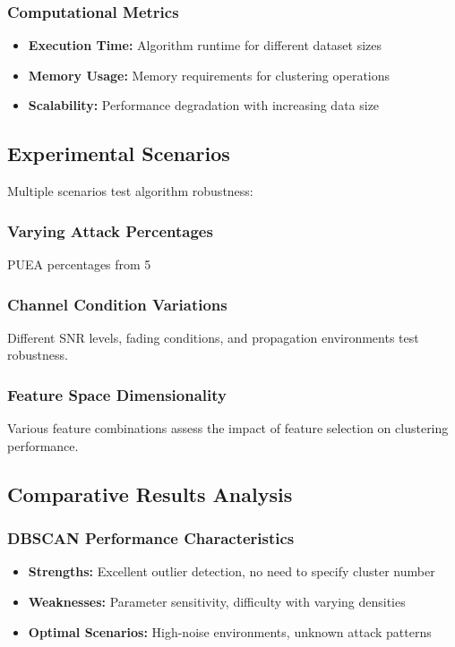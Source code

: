 \subsubsection{Computational Metrics}
\begin{itemize}
\item \textbf{Execution Time:} Algorithm runtime for different dataset sizes
\item \textbf{Memory Usage:} Memory requirements for clustering operations
\item \textbf{Scalability:} Performance degradation with increasing data size
\end{itemize}

\subsection{Experimental Scenarios}
Multiple scenarios test algorithm robustness:

\subsubsection{Varying Attack Percentages}
PUEA percentages from 5%

\subsubsection{Channel Condition Variations}
Different SNR levels, fading conditions, and propagation environments test robustness.

\subsubsection{Feature Space Dimensionality}
Various feature combinations assess the impact of feature selection on clustering performance.

\subsection{Comparative Results Analysis}

\subsubsection{DBSCAN Performance Characteristics}
\begin{itemize}
\item \textbf{Strengths:} Excellent outlier detection, no need to specify cluster number
\item \textbf{Weaknesses:} Parameter sensitivity, difficulty with varying densities
\item \textbf{Optimal Scenarios:} High-noise environments, unknown attack patterns
\end{itemize}

